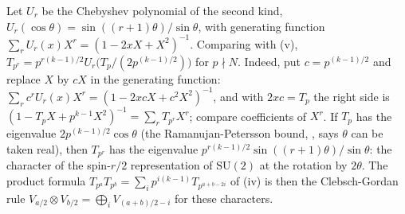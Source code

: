 \begin{remark}\label{rem:hecke:chebyshev}
Let $U_r$ be the Chebyshev polynomial of the second kind, $U_r(\cos\theta)=\sin((r+1)\theta)/\sin\theta$, with generating function $\sum_rU_r(x)X^r=(1-2xX+X^2)^{-1}$. Comparing with
(v), $T_{p^r}=p^{r(k-1)/2}U_r\bigl(T_p/(2p^{(k-1)/2})\bigr)$ for $p\nmid N$. Indeed, put $c=p^{(k-1)/2}$ and replace $X$ by $cX$ in the
generating function: $\sum_rc^rU_r(x)X^r=(1-2xcX+c^2X^2)^{-1}$, and with $2xc=T_p$ the right side is $(1-T_pX+p^{k-1}X^2)^{-1}=\sum_rT_{p^r}X^r$; compare coefficients of $X^r$. If $T_p$ has the eigenvalue $2p^{(k-1)/2}\cos\theta$ (the Ramanujan-Petersson bound, ,
says $\theta$ can be taken real), then $T_{p^r}$ has the eigenvalue $p^{r(k-1)/2}\sin((r+1)\theta)/\sin\theta$: the character of the spin-$r/2$ representation of $\mathrm{SU}(2)$ at the rotation by
$2\theta$. The product formula $T_{p^a}T_{p^b}=\sum_ip^{i(k-1)}T_{p^{a+b-2i}}$ of (iv) is then the Clebsch-Gordan rule $V_{a/2}\otimes V_{b/2}=\bigoplus_iV_{(a+b)/2-i}$ for
these characters.
\end{remark}


